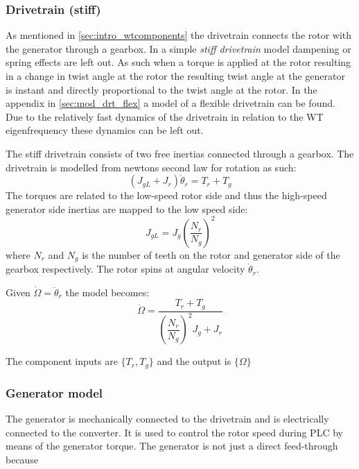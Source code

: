 \subsubsection{Drivetrain (stiff)} \label{sec:comp_drv}
As mentioned in \cref{sec:intro_wtcomponents} the drivetrain connects the rotor with the generator through a gearbox. In a simple \textit{stiff drivetrain} model dampening or spring effects are left out. As such when a torque is applied at the rotor resulting in a change in twist angle at the rotor the resulting twist angle at the generator is instant and directly proportional to the twist angle at the rotor. In the appendix in \cref{sec:mod_drt_flex} a model of a flexible drivetrain can be found. Due to the relatively fast dynamics of the drivetrain in relation to the WT eigenfrequency these dynamics can be left out. 

The stiff drivetrain consists of two free inertias connected through a gearbox. The drivetrain is modelled from newtons second law for rotation as such:
\begin{equation}\label{eq:wtlin_comp_drivetrain}
	(J_{gL} + J_{r}) \ddot{\theta}_r = T_{r} + T_{g}
\end{equation}
The torques are related to the low-speed rotor side and thus the high-speed generator side inertias are mapped to the low speed side:
\begin{equation} \label{eq:wtlin_comp_inertiamap}
	J_{gL} = J_{g} \left(\dfrac{N_r}{N_g}\right)^2
\end{equation}
where $ N_r $ and $ N_g $ is the number of teeth on the rotor and generator side of the gearbox respectively. The rotor spins at angular velocity $ \dot{\theta}_r $.

Given $ \dot{\Omega} = \ddot{\theta}_r $ the model becomes:
\begin{equation}\label{key}
	 \dot{\Omega} = \dfrac{T_{r} + T_{g}}{\left(\dfrac{N_r}{N_g}\right)^2 J_{g} + J_{r}}
\end{equation}

The component inputs are $ \{T_r, T_g\} $ and the output is $ \{\Omega\} $ 



\subsubsection{Generator model} \label{sec:comp_generator}
The generator is mechanically connected to the drivetrain and is electrically connected to the converter. It is used to control the rotor speed during PLC by means of the generator torque. The generator is not just a direct feed-through because 

